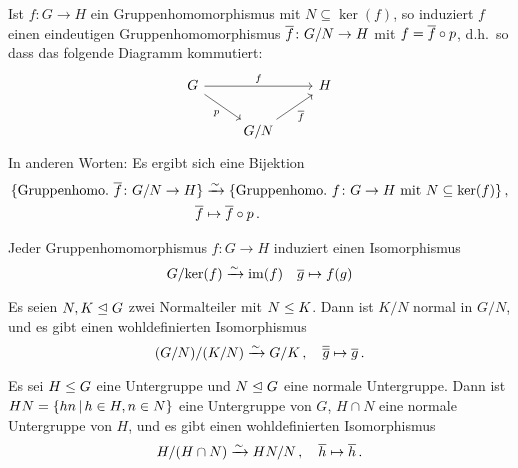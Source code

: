 \begin{theorem}[Homomorphiesatz]
  Ist $f \colon G \to H$ ein Gruppenhomomorphismus mit $N \subseteq \ker(f)$, so induziert $f$ einen eindeutigen Gruppenhomomorphismus $\overline{f} \colon G/N \to H$ mit $f = \overline{f} \circ p$, d.h.\ so dass das folgende Diagramm kommutiert:
  \[
    \begin{tikzcd}
        G
        \arrow{rr}[above]{f}
        \arrow{dr}[below left]{p}
      & {}
      & H
      \\
        {}
      & G/N
        \arrow{ru}[below right]{\induced{f}}
      & {}
    \end{tikzcd}
  \]
  In anderen Worten:
  Es ergibt sich eine Bijektion
  \begin{align*}
                        \{ \text{Gruppenhomo.\ $\overline{f} \colon G/N \to H$} \}
    &\xrightarrow{\sim} \{ \text{Gruppenhomo.\ $f \colon G \to H$ mit $N \subseteq \ker(f)$} \} \,,  \\
                        \overline{f}
    &\mapsto            \overline{f} \circ p \,.
  \end{align*}
\end{theorem}

\begin{corollary}[1.\ Isomorphiesatz]
  Jeder Gruppenhomomorphismus $f \colon G \to H$ induziert einen Isomorphismus
  \[
                        G/{\ker(f)}
    \xrightarrow{\sim}  \operatorname{im}(f)
    \quad               \overline{g}
    \mapsto             f(g)
  \]
\end{corollary}

\begin{corollary}[2.\ Isomorphiesatz]
  Es seien $N, K \mathrel{\trianglelefteq} G$ zwei Normalteiler mit $N \mathrel{\leq} K$.
  Dann ist $K/N$ normal in $G/N$, und es gibt einen wohldefinierten Isomorphismus
  \[
                        (G/N)/(K/N)
    \xrightarrow{\sim}  G/K \,,
    \quad               \overline{ \overline{g} }
    \mapsto             \overline{g} \,.
  \]
\end{corollary}

\begin{corollary}[3.\ Isomorphiesatz]
  Es sei $H \mathrel{\leq} G$ eine Untergruppe und $N \mathrel{\trianglelefteq} G$ eine normale Untergruppe.
  Dann ist $HN = \{hn \suchthat h \in H, n \in N\}$ eine Untergruppe von $G$, $H \cap N$ eine normale Untergruppe von $H$, und es gibt einen wohldefinierten Isomorphismus
  \[
                        H/(H \cap N)
    \xrightarrow{\sim}  HN/N \,,
    \quad               \overline{h}
    \mapsto             \overline{h} \,.
  \]
\end{corollary}




